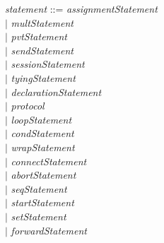 \textit{statement} ::= \textit{assignmentStatement}\\
\hspace*{5.3em} $ | $ \hspace{0.4em} \textit{multStatement} \\
\hspace*{5.3em} $ | $ \hspace{0.4em} \textit{pvtStatement} \\
\hspace*{5.3em} $ | $ \hspace{0.4em} \textit{sendStatement} \\
\hspace*{5.3em} $ | $ \hspace{0.4em} \textit{sessionStatement} \\
\hspace*{5.3em} $ | $ \hspace{0.4em} \textit{tyingStatement} \\
\hspace*{5.3em} $ | $ \hspace{0.4em} \textit{declarationStatement} \\
\hspace*{5.3em} $ | $ \hspace{0.4em} \textit{protocol} \\
\hspace*{5.3em} $ | $ \hspace{0.4em} \textit{loopStatement} \\
\hspace*{5.3em} $ | $ \hspace{0.4em} \textit{condStatement} \\
\hspace*{5.3em} $ | $ \hspace{0.4em} \textit{wrapStatement} \\
\hspace*{5.3em} $ | $ \hspace{0.4em} \textit{connectStatement} \\
\hspace*{5.3em} $ | $ \hspace{0.4em} \textit{abortStatement} \\
\hspace*{5.3em} $ | $ \hspace{0.4em} \textit{seqStatement} \\
\hspace*{5.3em} $ | $ \hspace{0.4em} \textit{startStatement} \\
\hspace*{5.3em} $ | $ \hspace{0.4em} \textit{setStatement} \\
\hspace*{5.3em} $ | $ \hspace{0.4em} \textit{forwardStatement}\smallskip

